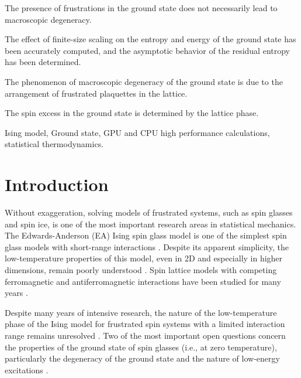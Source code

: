\documentclass[utf8, babel, sor, jor, amsmath, amssymb, reprint]{elsarticle} %
\begin{document}
\begin{frontmatter}
\begin{highlights}  
	\item The presence of frustrations in the ground state does not necessarily lead to macroscopic degeneracy.  
	\item The effect of finite-size scaling on the entropy and energy of the ground state has been accurately computed, and the asymptotic behavior of the residual entropy has been determined.  
	\item The phenomenon of macroscopic degeneracy of the ground state is due to the arrangement of frustrated plaquettes in the lattice.  
	\item The spin excess in the ground state is determined by the lattice phase.  
\end{highlights}  


\begin{keyword}
	Ising model, Ground state, GPU and CPU high performance calculations, statistical thermodynamics.
\end{keyword}


\end{frontmatter}

\linenumbers

\newpage
\tableofcontents

\newpage
\section{Introduction}

Without exaggeration, solving models of frustrated systems, such as spin glasses and spin ice, is one of the most important research areas in statistical mechanics. The Edwards-Anderson (EA) Ising spin glass model is one of the simplest spin glass models with short-range interactions \cite{edwards1975theory}. Despite its apparent simplicity, the low-temperature properties of this model, even in 2D and especially in higher dimensions, remain poorly understood \cite{pal1996ground, hartmann2011ground, newman2022ground}. Spin lattice models with competing ferromagnetic and antiferromagnetic interactions have been studied for many years \cite{binder1986spin, mezard1987spin, lebrecht2004plaquette, valdes2012j, lebrecht2015j, fan2023searching}.

Despite many years of intensive research, the nature of the low-temperature phase of the Ising model for frustrated spin systems with a limited interaction range remains unresolved \cite{roma2010ground, newman2023proof}. Two of the most important open questions concern the properties of the ground state of spin glasses (i.e., at zero temperature), particularly the degeneracy of the ground state and the nature of low-energy excitations \cite{newman2022ground}.
\end{document}
